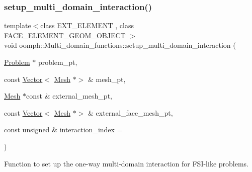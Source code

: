 \subsubsection{\texorpdfstring{setup\+\_\+multi\+\_\+domain\+\_\+interaction()}{setup\_multi\_domain\_interaction()}\hspace{0.1cm}{\footnotesize\ttfamily [3/3]}}
{\footnotesize\ttfamily template$<$class E\+X\+T\+\_\+\+E\+L\+E\+M\+E\+NT , class F\+A\+C\+E\+\_\+\+E\+L\+E\+M\+E\+N\+T\+\_\+\+G\+E\+O\+M\+\_\+\+O\+B\+J\+E\+CT $>$ \\
void oomph\+::\+Multi\+\_\+domain\+\_\+functions\+::setup\+\_\+multi\+\_\+domain\+\_\+interaction (\begin{DoxyParamCaption}\item[{\hyperlink{classoomph_1_1Problem}{Problem} $\ast$}]{problem\+\_\+pt,  }\item[{const \hyperlink{classoomph_1_1Vector}{Vector}$<$ \hyperlink{classoomph_1_1Mesh}{Mesh} $\ast$$>$ \&}]{mesh\+\_\+pt,  }\item[{\hyperlink{classoomph_1_1Mesh}{Mesh} $\ast$const \&}]{external\+\_\+mesh\+\_\+pt,  }\item[{const \hyperlink{classoomph_1_1Vector}{Vector}$<$ \hyperlink{classoomph_1_1Mesh}{Mesh} $\ast$$>$ \&}]{external\+\_\+face\+\_\+mesh\+\_\+pt,  }\item[{const unsigned \&}]{interaction\+\_\+index = {} }\end{DoxyParamCaption})}



Function to set up the one-\/way multi-\/domain interaction for F\+S\+I-\/like problems. 



